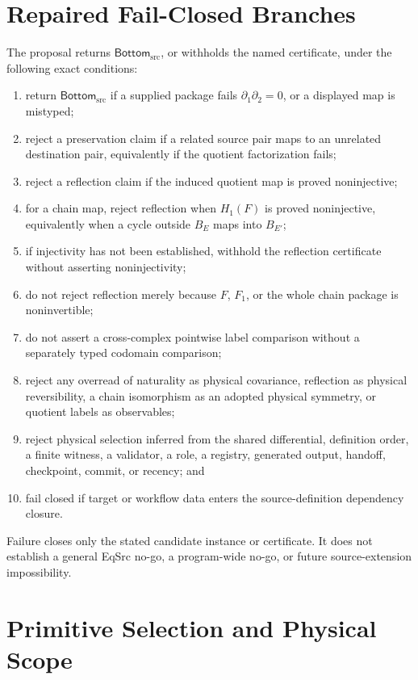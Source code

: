 \documentclass[11pt]{article}
\newcommand{\Bottom}{\mathsf{Bottom}_{\mathrm{src}}}
\begin{document}
\section{Repaired Fail-Closed Branches}

The proposal returns \(\Bottom\), or withholds the named certificate, under
the following exact conditions:
\begin{enumerate}[leftmargin=*]
  \item return \(\Bottom\) if a supplied package fails
  \(\partial_1\partial_2=0\), or a displayed map is mistyped;
  \item reject a preservation claim if a related source pair maps to an
  unrelated destination pair, equivalently if the quotient factorization
  fails;
  \item reject a reflection claim if the induced quotient map is proved
  noninjective;
  \item for a chain map, reject reflection when \(H_1(F)\) is proved
  noninjective, equivalently when a cycle outside \(B_E\) maps into
  \(B_{E'}\);
  \item if injectivity has not been established, withhold the reflection
  certificate without asserting noninjectivity;
  \item do not reject reflection merely because \(F\), \(F_1\), or the whole
  chain package is noninvertible;
  \item do not assert a cross-complex pointwise label comparison without a
  separately typed codomain comparison;
  \item reject any overread of naturality as physical covariance, reflection
  as physical reversibility, a chain isomorphism as an adopted physical
  symmetry, or quotient labels as observables;
  \item reject physical selection inferred from the shared differential,
  definition order, a finite witness, a validator, a role, a registry,
  generated output, handoff, checkpoint, commit, or recency; and
  \item fail closed if target or workflow data enters the source-definition
  dependency closure.
\end{enumerate}

Failure closes only the stated candidate instance or certificate. It does not
establish a general EqSrc no-go, a program-wide no-go, or future
source-extension impossibility.

\section{Primitive Selection and Physical Scope}
\end{document}
